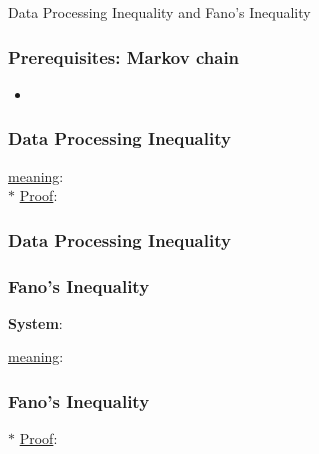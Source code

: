 \documentclass[9pt]{beamer}
\begin{document}
    \begin{section}{Data Processing Inequality and Fano's Inequality}
        \begin{frame}
            \frametitle{Prerequisites: Markov chain}
            \begin{definition}
            \end{definition}
            \begin{itemize}
                \item 
            \end{itemize}
        
        \end{frame}

        \begin{frame}
            \frametitle{Data Processing Inequality}
            \begin{theorem}
                
            \end{theorem}
            \checkmark \underline{meaning}:
            \\ $\ast$ \underline{Proof}: 
        \end{frame}

        \begin{frame}
            \frametitle{Data Processing Inequality}
            \begin{corollary}
                
            \end{corollary}
            \begin{corollary}
                
            \end{corollary}
        \end{frame}
    
        \begin{frame}
            \frametitle{Fano's Inequality}
            \textbf{System}: 
            \begin{theorem}
                
            \end{theorem}
            \checkmark \underline{meaning}:
        \end{frame}

        \begin{frame}
            \frametitle{Fano's Inequality}
            $\ast$ \underline{Proof}: 
        \end{frame}
    \end{section}
\end{document}
